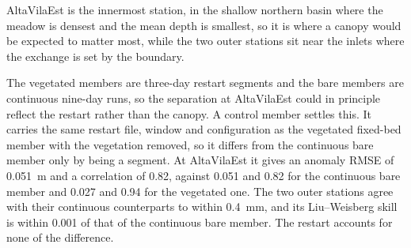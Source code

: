 AltaVilaEst is the innermost station, in the shallow northern basin where the
meadow is densest and the mean depth is smallest, so it is where a canopy would
be expected to matter most, while the two outer stations sit near the inlets
where the exchange is set by the boundary.

The vegetated members are three-day restart segments and the bare members are
continuous nine-day runs, so the separation at AltaVilaEst could in principle
reflect the restart rather than the canopy. A control member settles this. It
carries the same restart file, window and configuration as the vegetated
fixed-bed member with the vegetation removed, so it differs from the continuous
bare member only by being a segment. At AltaVilaEst it gives an anomaly RMSE of
0.051~m and a correlation of 0.82, against 0.051 and 0.82 for the continuous
bare member and 0.027 and 0.94 for the vegetated one. The two outer stations
agree with their continuous counterparts to within 0.4~mm, and its
Liu--Weisberg skill is within 0.001 of that of the continuous bare member. The
restart accounts for none of the difference.


